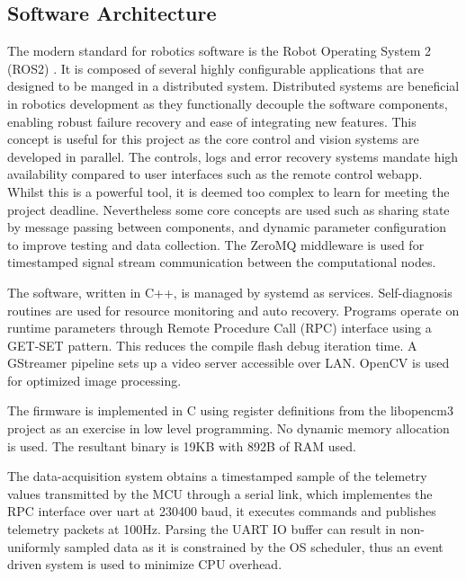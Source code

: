         \subsection{Software Architecture}
        The modern standard for robotics software is the Robot Operating System 2 (ROS2) \cite{Macenski2022RobotOS}. 
        It is composed of several highly configurable applications that are designed to be manged in a distributed system.
        Distributed systems are beneficial in robotics development as they functionally decouple the software components, 
        enabling robust failure recovery and ease of integrating new features. This concept is useful for this project as 
        the core control and vision systems are developed in parallel. The controls, logs and error recovery systems mandate 
        high availability compared to user interfaces such as the remote control webapp. 
        Whilst this is a powerful tool, it is deemed too complex to learn for meeting the project deadline.
        Nevertheless some core concepts are used such as sharing state by message passing between components, 
        and dynamic parameter configuration to improve testing and data collection. The ZeroMQ middleware is used for 
        timestamped signal stream communication between the computational nodes. 

        The software, written in C++, is managed by systemd as services. 
        Self-diagnosis routines are used for resource monitoring and auto recovery. 
        Programs operate on runtime parameters through Remote Procedure Call (RPC) 
        interface using a GET-SET pattern. This reduces the 
        compile flash debug iteration time. A GStreamer pipeline sets up a video 
        server accessible over LAN. OpenCV is used for optimized image processing.
      
        The firmware is implemented in C using register definitions from the 
        libopencm3 project \cite{BeginningSTM32} as an exercise in low level programming. 
        No dynamic memory allocation is used.
        The resultant binary is 19KB with 892B of RAM used.
       
        The data-acquisition system obtains a timestamped sample of the 
        telemetry values transmitted by the MCU through a serial link, which implementes the
        RPC interface over uart at 230400 baud, 
        it executes commands and publishes telemetry packets at 100Hz.
        Parsing the UART IO buffer can result in non-uniformly sampled data as it
        is constrained by the OS scheduler, thus an event driven system is used to 
        minimize CPU overhead.
